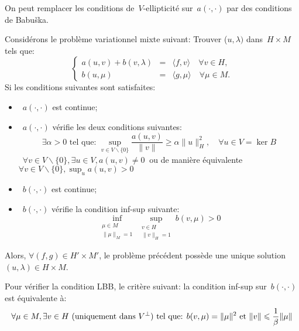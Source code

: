 \medskip
On peut remplacer les conditions de~$V$-ellipticité sur~$a(\cdot,\cdot)$ par des conditions de Babuška.

\medskip
\begin{theoreme}
Considérons le problème variationnel mixte suivant:
Trouver ($u, \lambda)$ dans~$H\times M$ tels que:
 \begin{equation}\left\{
\begin{array}{rcl}
 a(u,v) + b(v, \lambda) &=& \langle f,v\rangle \quad \forall v\in H,\\
b(u,\mu) &=& \langle g,\mu\rangle \quad \forall \mu \in M.
\end{array}\right.
\end{equation}
Si les conditions suivantes sont satisfaites:
\begin{itemize}
  \item~$a(\cdot,\cdot)$ est continue;
  \item~$a(\cdot,\cdot)$ vérifie les deux conditions suivantes:
  \begin{equation}\exists \alpha> 0 \text{ tel que: } \sup_{v\in V\backslash\{0\}} \frac{a(u,v)}{\|v\|} \ge\alpha\|u\|_H^2, \quad \forall u\in V=\ker B\end{equation}
 ~$\forall v\in V\backslash\{0\}, \exists u\in V, a(u,v)\ne 0~$ ou de manière équivalente
~$\displaystyle\forall v\in V\backslash\{0\}, \sup_u a(u,v)> 0~$
  \item~$b(\cdot,\cdot)$ est continue;
  \item~$b(\cdot,\cdot)$ vérifie la condition inf-sup suivante:
\begin{equation}\inf_{\substack{\mu\in M\\\|\mu\|_M=1}} \sup_{\substack{v\in H\\\|v\|_H=1}} b(v,\mu) > 0\end{equation}
\end{itemize}
Alors, $\forall (f,g)\in H'\times M'$, le problème précédent possède une unique solution
$(u,\lambda) \in H\times M$.
\end{theoreme}
\medskipvm
Pour vérifier la condition LBB,  le critère suivant:
la condition inf-sup sur~$b(\cdot,\cdot)$ est équivalente à:
\begin{equation}\colorred
\forall\mu\in M, \exists v\in H \text{ (uniquement dans } V^\bot\text{) tel que: }
b(v,\mu)=\|\mu\|^2 \text{ et } \|v\|\le \dfrac1\beta \|\mu\|
\end{equation}









